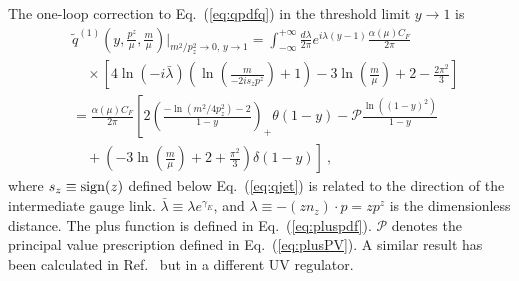 \documentclass[a4paper,11pt]{article}
\begin{document}
The one-loop correction to Eq.~(\ref{eq:qpdfq}) in the threshold limit $y \rightarrow 1$ is
\begin{align}\label{eq:qpdfq1loopfmtr}
&\tilde q^{(1)}\left(y,\frac{p^z}{\mu},\frac{m}{\mu}\right) \bigg|_{m^2/p_z^2 \rightarrow 0, \, y \rightarrow 1}
= \int_{-\infty}^{+\infty} \frac{d\lambda}{2\pi} e^{i \lambda (y-1)} \frac{\alpha(\mu) C_F}{2\pi} \nonumber\\
&\quad \times \left[  4 \ln \left(-i \bar{\lambda} \right) \left( \ln\left(\frac{m}{-2 i s_{z} p^z}\right) + 1 \right) - 3 \ln\left(\frac{m}{\mu}\right) + 2-\frac{2 \pi ^2}{3} \right] \nonumber\\
&= \frac{\alpha(\mu) C_F}{2\pi} \left[ 2 \left(\frac{-\ln \left(m^2/4 p_z^2\right)-2}{1-y}\right)_{+} \theta (1-y) - \mathcal{P} \frac{\ln \left((1-y)^2\right)}{1-y} \right.\nonumber\\
&\left. \quad + \left(-3 \ln \left(\frac{m}{\mu}\right)+2+\frac{\pi ^2}{3}\right) \delta (1-y)  \right] \ ,
\end{align}
where $s_z \equiv {\rm sign}(z)$ defined below Eq.~(\ref{eq:qjet}) is related to the direction of the intermediate gauge link. $\bar{\lambda} \equiv \lambda e^{\gamma_E}$, and $\lambda \equiv - (z n_z) \cdot p = z p^z$ is the dimensionless distance. The plus function is defined in Eq.~(\ref{eq:pluspdf}). $\mathcal{P}$ denotes the principal value prescription defined in Eq.~(\ref{eq:plusPV}). A similar result has been calculated in Ref.~\cite{Xiong:2013bka} but in a different UV regulator.   
\end{document}
